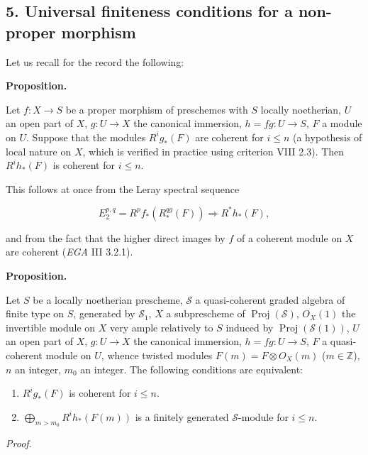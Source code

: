 \documentclass[
]{article}
\providecommand{\tightlist}{%
  \setlength{\itemsep}{0pt}\setlength{\parskip}{0pt}}
\begin{document}
\subsection{5. Universal finiteness conditions for a non-proper
morphism}\label{universal-finiteness-conditions-for-a-non-proper-morphism}

Let us recall for the record the following:

\textbf{Proposition.}

Let \(f: X \to S\) be a proper morphism of preschemes with \(S\) locally
noetherian, \(U\) an open part of \(X\), \(g: U \to X\) the canonical
immersion, \(h = fg: U \to S\), \(F\) a module on \(U\). Suppose that
the modules \(R^{i}g_{\ast}(F)\) are coherent for \(i \leqslant n\) (a
hypothesis of local nature on \(X\), which is verified in practice using
criterion VIII 2.3). Then \(R^{i}h_{\ast}(F)\) is coherent for
\(i \leqslant n\).

This follows at once from the Leray spectral sequence

\[
E^{p,q}_{2} = R^{p}f_{\ast}(R^{qg}_{\ast}(F)) \Rightarrow R^{\ast }h_{\ast}(F),
\]

and from the fact that the higher direct images by \(f\) of a coherent
module on \(X\) are coherent (\emph{EGA} III 3.2.1).

\textbf{Proposition.}

Let \(S\) be a locally noetherian prescheme, \(\mathcal{S}\) a
quasi-coherent graded algebra of finite type on \(S\), generated by
\(\mathcal{S}_{1}\), \(X\) a subprescheme of
\(\operatorname{Proj}(\mathcal{S})\), \(O_{X}(1)\) the invertible module
on \(X\) very ample relatively to \(S\) induced by
\(\operatorname{Proj}(\mathcal{S}(1))\), \(U\) an open part of \(X\),
\(g: U \to X\) the canonical immersion, \(h = fg: U \to S\), \(F\) a
quasi-coherent module on \(U\), whence twisted modules
\(F(m) = F \otimes O_{X}(m)\) (\(m \in \mathbb{Z}\)), \(n\) an integer,
\(m_{0}\) an integer. The following conditions are equivalent:

\begin{enumerate}
\def\labelenumi{\arabic{enumi}.}
\tightlist
\item
  \(R^{i}g_{\ast}(F)\) is coherent for \(i \leqslant n\).
\item
  \(\bigoplus_{m>m_{0}} R^{i}h_{\ast}(F(m))\) is a finitely generated
  \(\mathcal{S}\)-module for \(i \leqslant n\).
\end{enumerate}

\emph{Proof.}
\end{document}
